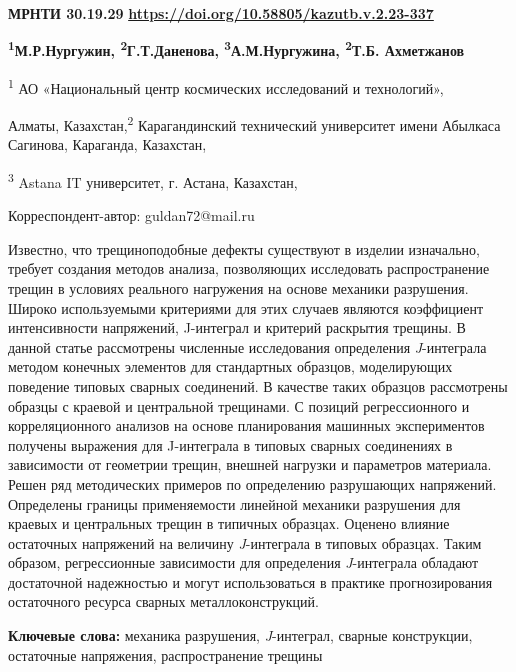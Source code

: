 \newpage
{\bfseries МРНТИ 30.19.29}
\hfill {\bfseries \href{https://doi.org/10.58805/kazutb.v.2.23-337}{https://doi.org/10.58805/kazutb.v.2.23-337}}


\begin{center}
{\bfseries \textsuperscript{1}М.Р.Нургужин, \textsuperscript{2}Г.Т.Даненова\envelope, \textsuperscript{3}А.М.Нургужина, \textsuperscript{2}Т.Б. Ахметжанов}

\textsuperscript{1} АО «Национальный центр космических исследований и
технологий»,

Алматы, Казахстан,\textsuperscript{2} Карагандинский технический
университет имени Абылкаса Сагинова, Караганда, Казахстан,

\textsuperscript{3} Astana IT университет, г. Астана, Казахстан,

\envelope Корреспондент-автор: guldan72@mail.ru
\end{center}

Известно, что трещиноподобные дефекты существуют в изделии изначально,
требует создания методов анализа, позволяющих исследовать
распространение трещин в условиях реального нагружения на основе
механики разрушения. Широко используемыми критериями для этих случаев
являются коэффициент интенсивности напряжений, J-интеграл и критерий
раскрытия трещины. В данной статье рассмотрены численные исследования
определения \emph{J}-интеграла методом конечных элементов для
стандартных образцов, моделирующих поведение типовых сварных соединений.
В качестве таких образцов рассмотрены образцы с краевой и центральной
трещинами. С позиций регрессионного и корреляционного анализов на основе
планирования машинных экспериментов получены выражения для J-интеграла в
типовых сварных соединениях в зависимости от геометрии трещин, внешней
нагрузки и параметров материала. Решен ряд методических примеров по
определению разрушающих напряжений. Определены границы применяемости
линейной механики разрушения для краевых и центральных трещин в типичных
образцах. Оценено влияние остаточных напряжений на величину
\emph{J}-интеграла в типовых образцах. Таким образом, регрессионные
зависимости для определения \emph{J}-интеграла обладают достаточной
надежностью и могут использоваться в практике прогнозирования
остаточного ресурса сварных металлоконструкций.

{\bfseries Ключевые слова:} механика разрушения, \emph{J}-интеграл, сварные
конструкции, остаточные напряжения, распространение трещины

